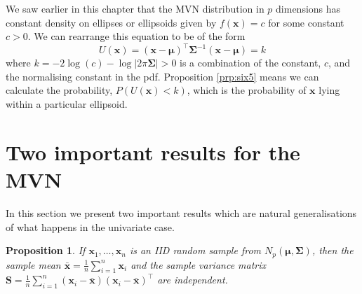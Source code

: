 \documentclass[]{book}
\newtheorem{proposition}{Proposition}[chapter]
\theoremstyle{definition}
\theoremstyle{definition}
\theoremstyle{definition}
\theoremstyle{remark}
\begin{document}
We saw earlier in this chapter that the MVN distribution in \(p\) dimensions has constant density on ellipses or ellipsoids given by \(f(\boldsymbol x) = c\) for some constant \(c > 0\). We can rearrange this equation to be of the form
\[U(\boldsymbol x) = (\boldsymbol x-\boldsymbol \mu)^\top \boldsymbol \Sigma^{-1} (\boldsymbol x-\boldsymbol \mu) = k\]
where \(k = - 2 \log(c) - \log |2 \pi \boldsymbol \Sigma| > 0\) is a combination of the constant, \(c\), and the normalising constant in the pdf. Proposition \ref{prp:six5} means we can calculate the probability, \(P(U(\boldsymbol x)<k)\), which is the probability of \(\boldsymbol x\) lying within a particular ellipsoid.

\hypertarget{two-important-results-for-the-mvn}{%
\section{Two important results for the MVN}\label{two-important-results-for-the-mvn}}

In this section we present two important results which are natural
generalisations of what happens in the univariate case.

\begin{proposition}
\protect\hypertarget{prp:six6}{}{\label{prp:six6} }If \(\boldsymbol x_1, \ldots, \boldsymbol x_n\) is an IID random sample from \(N_p(\boldsymbol \mu, \boldsymbol \Sigma)\), then the sample mean \(\bar{\boldsymbol x} = \frac{1}{n} \sum_{i=1}^n \boldsymbol x_i\) and the sample variance matrix \(\boldsymbol S= \frac{1}{n} \sum_{i=1}^n (\boldsymbol x_i - \bar{\boldsymbol x})(\boldsymbol x_i-\bar{\boldsymbol x})^\top\) are independent.
\end{proposition}
\end{document}
